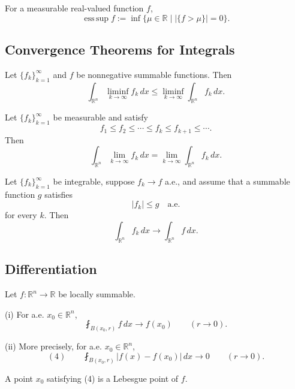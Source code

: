 \begin{definition}
\label{def:essential-supremum}
For a measurable real-valued function $f$,
\[
\operatorname*{ess\,sup}f
:=\inf\{\mu\in\mathbb R\mid |\{f>\mu\}|=0\}.
\]
\end{definition}

\subsection{Convergence Theorems for Integrals}
\label{sec:convergence-theorems-for-integrals}

\begin{theorem}
\label{thm:fatous-lemma}
Let $\{f_k\}_{k=1}^\infty$ and $f$ be nonnegative summable functions. Then
\[
\int_{\mathbb R^n}\liminf_{k\to\infty}f_k\,dx
\leq\liminf_{k\to\infty}\int_{\mathbb R^n}f_k\,dx.
\]
\end{theorem}

\begin{theorem}
\label{thm:monotone-convergence-theorem}
Let $\{f_k\}_{k=1}^\infty$ be measurable and satisfy
\[
f_1\leq f_2\leq\cdots\leq f_k\leq f_{k+1}\leq\cdots.
\]
Then
\[
\int_{\mathbb R^n}\lim_{k\to\infty}f_k\,dx
=\lim_{k\to\infty}\int_{\mathbb R^n}f_k\,dx.
\]
\end{theorem}

\begin{theorem}
\label{thm:dominated-convergence-theorem}
Let $\{f_k\}_{k=1}^\infty$ be integrable, suppose $f_k\to f$ a.e., and assume
that a summable function $g$ satisfies
\[
|f_k|\leq g\quad\text{a.e.}
\]
for every $k$. Then
\[
\int_{\mathbb R^n}f_k\,dx\to\int_{\mathbb R^n}f\,dx.
\]
\end{theorem}

\subsection{Differentiation}
\label{sec:differentiation}

\begin{theorem}
\label{thm:lebesgue-differentiation-theorem}
Let $f:\mathbb R^n\to\mathbb R$ be locally summable.

(i) For a.e. $x_0\in\mathbb R^n$,
\[
\fint_{B(x_0,r)}f\,dx\to f(x_0)\qquad(r\to0).
\]

(ii) More precisely, for a.e. $x_0\in\mathbb R^n$,
\[
(4)\qquad
\fint_{B(x_0,r)}|f(x)-f(x_0)|\,dx\to0
\qquad(r\to0).
\]

A point $x_0$ satisfying (4) is a Lebesgue point of $f$.
\end{theorem}


